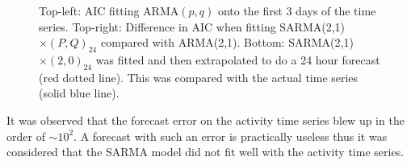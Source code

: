 \documentclass[]{article}
\begin{document}
\begin{figure}[htbp]
	\centering
	\hfill
	\caption{Top-left: AIC fitting ARMA$(p,q)$ onto the first 3 days of the time series. Top-right: Difference in AIC when fitting SARMA(2,1)$\times(P,Q)_{24}$ compared with ARMA(2,1). Bottom: SARMA(2,1)$\times(2,0)_{24}$ was fitted and then extrapolated to do a 24 hour forecast (red dotted line). This was compared with the actual time series (solid blue line).}
	\label{fig:sarmafit}
\end{figure}

It was observed that the forecast error on the activity time series blew up in the order of $\sim 10^2$. A forecast with such an error is practically useless thus it was considered that the SARMA model did not fit well with the activity time series.
\end{document}
